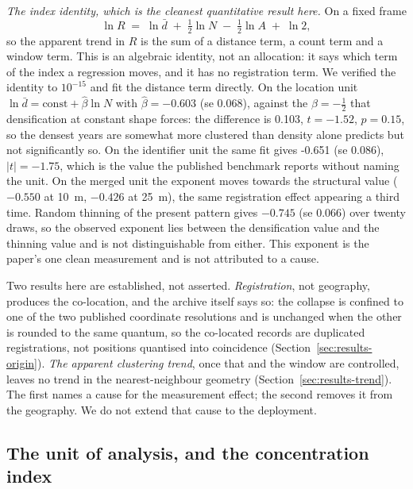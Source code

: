\documentclass{article}
\newcommand{\cleanSlope}{-0.651}
\newcommand{\cleanT}{-1.75}
\newcommand{\cleanSlopeLoc}{-0.603}
\newcommand{\cleanSELoc}{0.068}
\newcommand{\cleanTLoc}{-1.52}
\newcommand{\cleanPLoc}{0.15}
\newcommand{\cleanSlopeSite}{-0.550}
\newcommand{\cleanSlopeSiteTwo}{-0.426}
\newcommand{\thinningBeta}{-0.745}
\begin{document}
\noindent\emph{The index identity, which is the cleanest quantitative result here.} On a fixed
frame
\begin{equation}
\ln R \;=\; \ln \bar{d} \;+\; \tfrac{1}{2}\ln N \;-\; \tfrac{1}{2}\ln A \;+\; \ln 2,
\label{eq:decomp}
\end{equation}
so the apparent trend in $R$ is the sum of a distance term, a count term and a window term. This
is an algebraic identity, not an allocation: it says which term of the index a regression moves,
and it has no registration term. We
verified the identity to $10^{-15}$ and fit the distance term directly. On the location unit
$\ln\bar{d} = \mathrm{const} + \hat\beta\ln N$ with $\hat\beta = \cleanSlopeLoc$
(se \cleanSELoc), against the $\beta = -\tfrac12$ that densification at constant shape forces:
the difference is \num{0.103}, $t = \cleanTLoc$, $p = \cleanPLoc$, so the densest years are
somewhat more clustered than density alone predicts but not significantly so. On the identifier
unit the same fit gives \cleanSlope{} (se $0.086$), $|t| = \cleanT$, which is the value the
published benchmark reports without naming the unit. On the merged unit the exponent
moves towards the structural value ($\cleanSlopeSite$ at \SI{10}{\meter},
$\cleanSlopeSiteTwo$ at \SI{25}{\meter}), the same registration effect appearing a third time.
Random thinning of the present pattern gives $\thinningBeta$ (se \num{0.066}) over twenty draws,
so the observed exponent lies between the densification value and the thinning value and is not
distinguishable from either. This exponent is the paper's one clean measurement and is not
attributed to a cause.

Two results here are established, not asserted. \emph{Registration}, not geography, produces
the co-location, and the archive itself says so: the collapse is confined to one of the two
published coordinate resolutions and is unchanged when the other is rounded to the same quantum,
so the co-located records are duplicated registrations, not positions quantised into
coincidence (Section~\ref{sec:results-origin}). \emph{The apparent clustering trend}, once that
and the window are controlled, leaves no trend in the nearest-neighbour geometry
(Section~\ref{sec:results-trend}). The first names a cause for the measurement effect; the second
removes it from the geography. We do not extend that cause to the deployment.

\subsection{The unit of analysis, and the concentration index}
\label{sec:results-unit}
\end{document}
